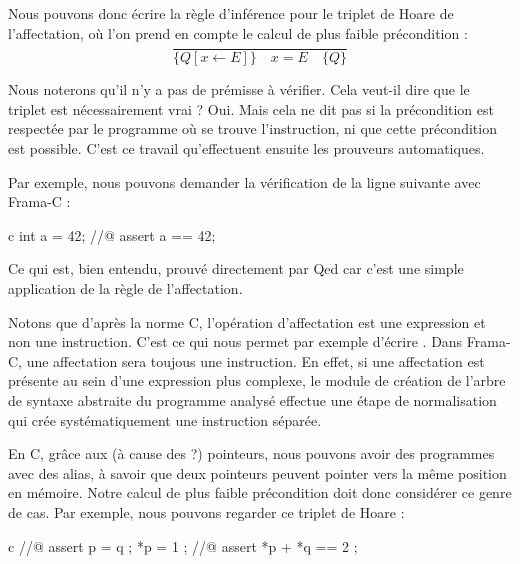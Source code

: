 Nous pouvons donc écrire la règle d'inférence pour le triplet de Hoare de 
l'affectation, où l'on prend en compte le calcul de plus faible précondition :
$$\dfrac{}{\{Q[x \leftarrow E] \}\quad x = E \quad\{ Q \}}$$


Nous noterons qu'il n'y a pas de prémisse à vérifier. Cela veut-il dire que le
triplet est nécessairement vrai ? Oui. Mais cela ne dit pas si la précondition 
est respectée par le programme où se trouve l'instruction, ni que cette 
précondition est possible. C'est ce travail qu'effectuent ensuite les prouveurs
automatiques.



Par exemple, nous pouvons demander la vérification de la ligne suivante avec 
Frama-C :



\begin{CodeBlock}{c}
int a = 42;
//@ assert a == 42;
\end{CodeBlock}



Ce qui est, bien entendu, prouvé directement par Qed car c'est une simple 
application de la règle de l'affectation.



\begin{Information}
Notons que d'après la norme C, l'opération d'affectation est une expression
et non une instruction. C'est ce qui nous permet par exemple d'écrire 
. Dans Frama-C, une affectation sera toujous une
instruction. En effet, si une affectation est présente au sein d'une 
expression plus complexe, le module de création de l'arbre de syntaxe abstraite
du programme analysé effectue une étape de normalisation qui crée 
systématiquement une instruction séparée.
\end{Information}





En C, grâce aux (à cause des ?) pointeurs, nous pouvons avoir des programmes avec
des alias, à savoir que deux pointeurs peuvent pointer vers la même position en 
mémoire. Notre calcul de plus faible précondition doit donc considérer ce genre
de cas. Par exemple, nous pouvons regarder ce triplet de Hoare :


\begin{CodeBlock}{c}
//@ assert p = q ;
*p = 1 ;
//@ assert *p + *q == 2 ;
\end{CodeBlock}


